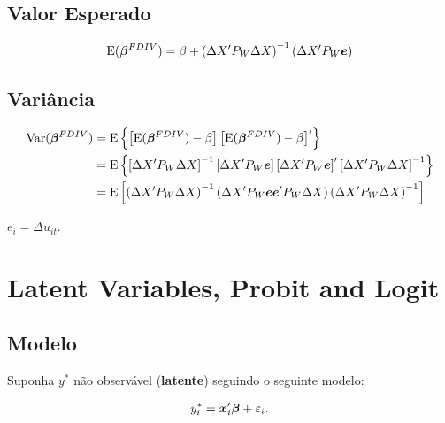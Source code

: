 \documentclass[11pt, oneside, a4paper, article]{article}
\numberwithin{equation}{section}
\begin{document}
\begin{description}
	\subsection{Valor Esperado}

	\vspace{-1 em}
	\begin{align*}
		\text{E}( \boldsymbol{\beta}^{FDIV} ) =  
		\beta + 
		\left( \Delta X' P_{W} \Delta X \right)^{-1}
		\left( \Delta X' P_{W} \boldsymbol{e} \right)
	\end{align*}

	\subsection{Variância}

	\vspace{-1 em}
	\begin{align*}
		\text{Var}( \boldsymbol{\beta}^{FDIV} ) &=
		\text{E}\left\{  
			\left[ \text{E}( \boldsymbol{\beta}^{FDIV} ) - \beta \right] 
			\left[ \text{E}( \boldsymbol{\beta}^{FDIV} ) - \beta \right]'
		\right\}
		\\
		&=
		\text{E}\left\{  
			\left[ \Delta X' P_{W} \Delta X \right]^{-1}
			\left[ \Delta X' P_{W} \boldsymbol{e} \right]
			\left[ \Delta X' P_{W} \boldsymbol{e} \right]'
			\left[ \Delta X' P_{W} \Delta X \right]^{-1}
		\right\}
		\\
		&=
		\text{E}\left[
			\left( \Delta X' P_{W} \Delta X \right)^{-1}
			\left( \Delta X' P_{W} \boldsymbol{e} \boldsymbol{e}' P_{W} \Delta X \right)
			\left( \Delta X' P_{W} \Delta X \right)^{-1}
		\right]
	\end{align*}

	\noindent
	$e_{i} = \Delta u_{it}$.

	\clearpage
	\section{Latent Variables, Probit and Logit}

	\subsection{Modelo}

	Suponha $y^{*}$ não observável (\textbf{latente}) seguindo o seguinte modelo:

	\vspace{-1 em}
	\begin{align} \label{mod1:probit}
		y_{i}^{*} = \boldsymbol{x}_{i}' \boldsymbol{\beta} + \varepsilon_{i}.
	\end{align}


\end{description}
\end{document}
